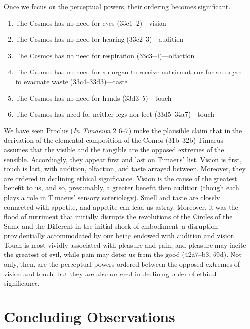 Once we focus on the perceptual powers, their ordering becomes significant. 
\begin{enumerate}[(1)]
	\item The Cosmos has no need for eyes (33c1–2)---vision
	\item The Cosmos has no need for hearing (33c2–3)---audition
	\item The Cosmos has no need for respiration (33c3–4)---olfaction
	\item The Cosmos has no need for an organ to receive nutriment nor for an organ to evacuate waste (33c4–33d3)---taste
	\item The Cosmos has no need for hands (33d3–5)---touch
	\item The Cosmos has need for neither legs nor feet (33d5–34a7)---touch
\end{enumerate}
We have seen Proclus (\emph{In Timaeum} 2 6--7) make the plausible claim that in the derivation of the elemental composition of the Comos (31b--32b) Timaeus assumes that the visible and the tangible are the opposed extremes of the sensible. Accordingly, they appear first and last on Timaeus' list. Vision is first, touch is last, with audition, olfaction, and taste arrayed between. Moreover, they are ordered in declining ethical significance. Vision is the cause of the greatest benefit to us, and so, presumably, a greater benefit then audition (though each plays a role in Timaeus' sensory soteriology). Smell and taste are closely connected with appetite, and appetite can lead us astray. Moreover, it was the flood of nutriment that initially disrupts the revolutions of the Circles of the Same and the Different in the initial shock of embodiment, a disruption providentially accommodated by our being endowed with audition and vision. Touch is most vividly associated with pleasure and pain, and pleasure may incite the greatest of evil, while pain may deter us from the good (42a7–b3, 69d). Not only, then, are the perceptual powers ordered between the opposed extremes of vision and touch, but they are also ordered in declining order of ethical significance.





\section{Concluding Observations} %
\label{sec:concluding_observations_incarnation}




